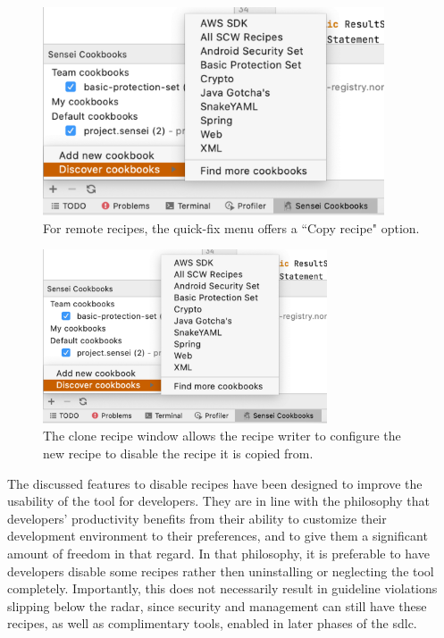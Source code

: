\begin{figure}
  \centering
  \includegraphics[width=0.9\textwidth,page=4]{04-tools/figures/figures1.pdf}
  \caption[Copy recipe option in the quick-fix menu]{For remote recipes, the quick-fix menu offers a ``Copy recipe" option.}
  \label{fig:copyrecipe} 
\end{figure}

\begin{figure}
  \centering
  \includegraphics[width=0.75\textwidth,page=2]{04-tools/figures/figures1.pdf}
  \caption[Clone recipe window]{The clone recipe window allows the recipe writer to configure the new recipe to disable the recipe it is copied from.}
  \label{fig:clonewindow} 
\end{figure}

The discussed features to disable recipes have been designed to improve the usability of the tool for developers.
They are in line with the philosophy that developers' productivity benefits from their ability to customize their development environment to their preferences, and to give them a significant amount of freedom in that regard.
In that philosophy, it is preferable to have developers disable some recipes rather then uninstalling or neglecting the tool completely.
Importantly, this does not necessarily result in guideline violations slipping below the radar, since security and management can still have these recipes, as well as complimentary tools, enabled in later phases of the \gls{sdlc}.

